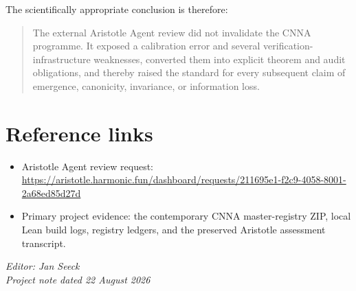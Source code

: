 \documentclass[11pt,a4paper]{article}
\begin{document}
The scientifically appropriate conclusion is therefore:

\begin{quote}
The external Aristotle Agent review did not invalidate the CNNA programme. It exposed a calibration error and several verification-infrastructure weaknesses, converted them into explicit theorem and audit obligations, and thereby raised the standard for every subsequent claim of emergence, canonicity, invariance, or information loss.
\end{quote}

\section*{Reference links}

\begin{itemize}
  \item Aristotle Agent review request: \url{https://aristotle.harmonic.fun/dashboard/requests/211695e1-f2c9-4058-8001-2a68ed85d27d}
  \item Primary project evidence: the contemporary CNNA master-registry ZIP, local Lean build logs, registry ledgers, and the preserved Aristotle assessment transcript.
\end{itemize}

\vfill
\begin{flushright}
\textit{Editor: Jan Seeck}\\
\textit{Project note dated 22 August 2026}
\end{flushright}
\end{document}
